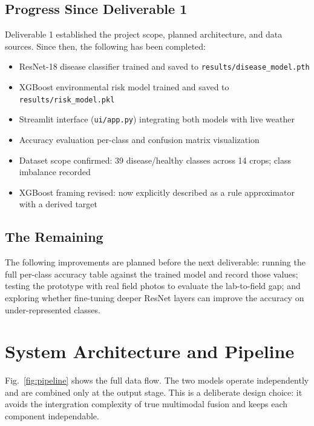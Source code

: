 \documentclass[conference]{IEEEtran}
\begin{document}
\subsection{Progress Since Deliverable 1}
Deliverable 1 established the project scope, planned architecture, and data sources. Since then, the following has been completed:

\begin{itemize}[noitemsep]
  \item ResNet-18 disease classifier trained and saved to \texttt{results/disease\_model.pth}
  \item XGBoost environmental risk model trained and saved to \texttt{results/risk\_model.pkl}
  \item Streamlit interface (\texttt{ui/app.py}) integrating both models with live weather
  \item Accuracy evaluation per-class and confusion matrix visualization
  \item Dataset scope confirmed: 39 disease/healthy classes across 14 crops; class imbalance recorded
  \item XGBoost framing revised: now explicitly described as a rule approximator with a derived target
\end{itemize}

\subsection{The Remaining}
The following improvements are planned before the next deliverable: running the full per-class accuracy table against the trained model and record those values; testing the prototype with real field photos to evaluate the lab-to-field gap; and exploring whether fine-tuning deeper ResNet layers can improve the accuracy on under-represented classes.

\section{System Architecture and Pipeline}

Fig.~\ref{fig:pipeline} shows the full data flow. The two models operate independently and are combined only at the output stage. This is a deliberate design choice: it avoids the intergration complexity of true multimodal fusion and keeps each component independable.
\end{document}

